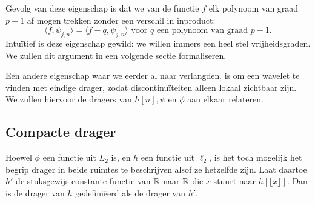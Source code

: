 Gevolg van deze eigenschap is dat we van de functie $f$ elk polynoom van graad $p-1$ af mogen trekken zonder een verschil in inproduct:
\[
\langle f, \psi_{j,n} \rangle = \langle f - q, \psi_{j,n} \rangle \text{ voor $q$ een polynoom van graad $p-1$}.
\]
Intu\"itief is deze eigenschap gewild: we willen immers een heel stel vrijheidsgraden. 
We zullen dit argument in een volgende sectie formaliseren.

Een andere eigenschap waar we eerder al naar verlangden, is om een wavelet te vinden met eindige drager, 
zodat discontinu\"iteiten alleen lokaal zichtbaar zijn. 
We zullen hiervoor de dragers van $h[n], \psi$ en $\phi$ aan elkaar relateren.

\subsection{Compacte drager}
Hoewel $\phi$ een functie uit $L_2$ is, en $h$ een functie uit $\ell_2$, is het toch mogelijk het begrip drager in beide ruimtes te beschrijven alsof ze hetzelfde zijn. Laat daartoe $h'$ de stuksgewijs constante functie van $\mathbb{R}$ naar $\mathbb{R}$ die $x$ stuurt naar $h\left [\lfloor x \rfloor\right ]$. Dan is de drager van $h$ gedefini\"eerd als de drager van $h'$.

